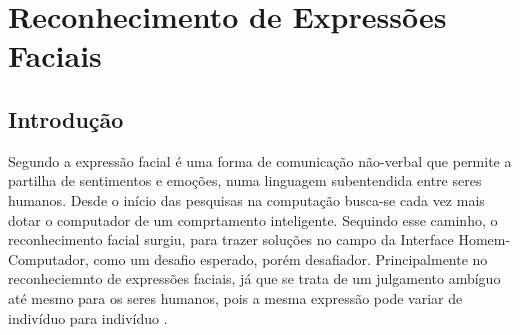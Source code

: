 \chapter{Reconhecimento de Expressões Faciais}

\section{Introdução}
Segundo  a expressão facial é uma forma de comunicação não-verbal que permite a partilha de
sentimentos e emoções, numa linguagem subentendida entre seres humanos. Desde o início das pesquisas na computação busca-se cada vez mais dotar o computador de um comprtamento inteligente. Sequindo esse caminho, o reconhecimento facial surgiu,  para trazer soluções no campo da Interface Homem- Computador, como um desafio esperado, porém desafiador. Principalmente no reconheciemnto de expressões faciais, já que se trata de um julgamento ambíguo até mesmo para os seres humanos, pois a mesma expressão pode variar de indivíduo para indivíduo \cite{FernandoGil} \cite{Elizabeth}.

